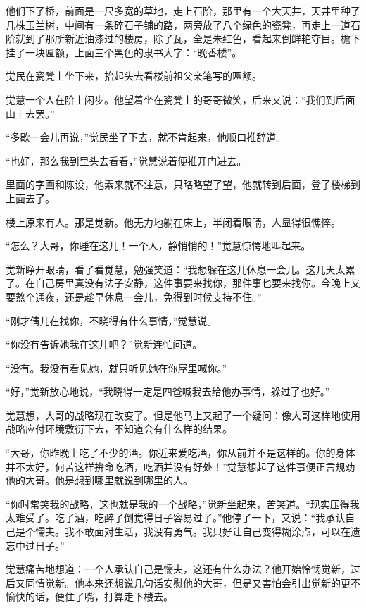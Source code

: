 \par 他们下了桥，前面是一尺多宽的草地，走上石阶，那里有一个大天井，天井里种了几株玉兰树，中间有一条碎石子铺的路，两旁放了八个绿色的瓷凳，再走上一道石阶就到了那所新近油漆过的楼房，除了瓦，全是朱红色，看起来倒鲜艳夺目。檐下挂了一块匾额，上面三个黑色的隶书大字：“晚香楼”。
\par 觉民在瓷凳上坐下来，抬起头去看楼前祖父亲笔写的匾额。
\par 觉慧一个人在阶上闲步。他望着坐在瓷凳上的哥哥微笑，后来又说：“我们到后面山上去罢。”
\par “多歇一会儿再说，”觉民坐了下去，就不肯起来，他顺口推辞道。
\par “也好，那么我到里头去看看，”觉慧说着便推开门进去。
\par 里面的字画和陈设，他素来就不注意，只略略望了望，他就转到后面，登了楼梯到上面去了。
\par 楼上原来有人。那是觉新。他无力地躺在\WangGua 床上，半闭着眼睛，人显得很憔悴。
\par “怎么？大哥，你睡在这儿！一个人，静悄悄的！”觉慧惊愕地叫起来。
\par 觉新睁开眼睛，看了看觉慧，勉强笑道：“我想躲在这儿休息一会儿。这几天太累了。在自己房里真没有法子安静，这件事要来找你，那件事也要来找你。今晚上又要熬个通夜，还是趁早休息一会儿，免得到时候支持不住。”
\par “刚才倩儿在找你，不晓得有什么事情，”觉慧说。
\par “你没有告诉她我在这儿吧？”觉新连忙问道。
\par “没有。我没有看见她，就只听见她在你屋里喊你。”
\par “好，”觉新放心地说，“我晓得一定是四爸喊我去给他办事情，躲过了也好。”
\par 觉慧想，大哥的战略现在改变了。但是他马上又起了一个疑问：像大哥这样地使用战略应付环境敷衍下去，不知道会有什么样的结果。
\par “大哥，你昨晚上吃了不少的酒。你近来爱吃酒，你从前并不是这样的。你的身体并不太好，何苦这样拚命吃酒，吃酒并没有好处！”觉慧想起了这件事便正言规劝他的大哥。他是想到哪里就说到哪里的人。
\par “你时常笑我的战略，这也就是我的一个战略，”觉新坐起来，苦笑道。“现实压得我太难受了。吃了酒，吃醉了倒觉得日子容易过了。”他停了一下，又说：“我承认自己是个懦夫。我不敢面对生活，我没有勇气。我只好让自己变得糊涂点，可以在遗忘中过日子。”
\par 觉慧痛苦地想道：一个人承认自己是懦夫，这还有什么办法？他开始怜悯觉新，过后又同情觉新。他本来还想说几句话安慰他的大哥，但是又害怕会引出觉新的更不愉快的话，便住了嘴，打算走下楼去。
